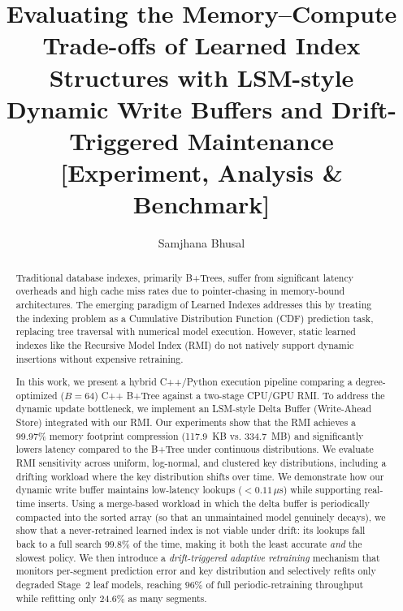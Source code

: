 \documentclass[sigconf, nonacm]{acmart}
\begin{document}
\title{Evaluating the Memory--Compute Trade-offs of Learned Index Structures with LSM-style Dynamic Write Buffers and Drift-Triggered Maintenance [Experiment, Analysis \& Benchmark]}

\author{Samjhana Bhusal}


\begin{abstract}
Traditional database indexes, primarily B+Trees, suffer from significant latency overheads and high cache miss rates due to pointer-chasing in memory-bound architectures. The emerging paradigm of Learned Indexes addresses this by treating the indexing problem as a Cumulative Distribution Function (CDF) prediction task, replacing tree traversal with numerical model execution. However, static learned indexes like the Recursive Model Index (RMI) do not natively support dynamic insertions without expensive retraining. 

In this work, we present a hybrid C++/Python execution pipeline comparing a degree-optimized ($B=64$) C++ B+Tree against a two-stage CPU/GPU RMI. To address the dynamic update bottleneck, we implement an LSM-style Delta Buffer (Write-Ahead Store) integrated with our RMI. Our experiments show that the RMI achieves a 99.97\% memory footprint compression (117.9~KB vs. 334.7~MB) and significantly lowers latency compared to the B+Tree under continuous distributions. We evaluate RMI sensitivity across uniform, log-normal, and clustered key distributions, including a drifting workload where the key distribution shifts over time. We demonstrate how our dynamic write buffer maintains low-latency lookups ($<0.11\,\mu$s) while supporting real-time inserts. Using a merge-based workload in which the delta buffer is periodically compacted into the sorted array (so that an unmaintained model genuinely decays), we show that a never-retrained learned index is not viable under drift: its lookups fall back to a full search $99.8\%$ of the time, making it both the least accurate \textit{and} the slowest policy. We then introduce a \textit{drift-triggered adaptive retraining} mechanism that monitors per-segment prediction error and key distribution and selectively refits only degraded Stage~2 leaf models, reaching $96\%$ of full periodic-retraining throughput while refitting only $24.6\%$ as many segments.
\end{abstract}
\end{document}
